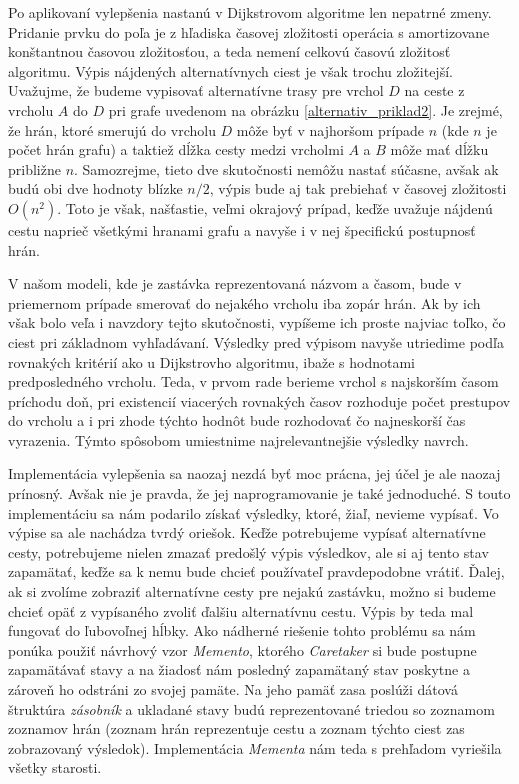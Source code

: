 Po aplikovaní vylepšenia nastanú v Dijkstrovom algoritme len nepatrné zmeny. Pridanie prvku do poľa je z hľadiska časovej zložitosti operácia s amortizovane konštantnou časovou zložitosťou, a teda nemení celkovú časovú zložitosť algoritmu. Výpis nájdených alternatívnych ciest je však trochu zložitejší. Uvažujme, že budeme vypisovať alternatívne trasy pre vrchol $D$ na ceste z vrcholu $A$ do $D$ pri grafe uvedenom na obrázku \ref{alternativ_priklad2}. Je zrejmé, že hrán, ktoré smerujú do vrcholu $D$ môže byť v najhoršom prípade $n$ (kde $n$ je počet hrán grafu) a taktiež dĺžka cesty medzi vrcholmi $A$ a $B$ môže mať dĺžku približne $n$. Samozrejme, tieto dve skutočnosti nemôžu nastať súčasne, avšak ak budú obi dve hodnoty blízke $n/2$, výpis bude aj tak prebiehať v časovej zložitosti $O(n^{2})$. Toto je však, našťastie, veľmi okrajový prípad, keďže uvažuje nájdenú cestu naprieč všetkými hranami grafu a navyše i v nej špecifickú postupnosť hrán.\newline

V našom modeli, kde je zastávka reprezentovaná názvom a časom, bude v priemernom prípade smerovať do nejakého vrcholu iba zopár hrán. Ak by ich však bolo veľa i navzdory tejto skutočnosti, vypíšeme ich proste najviac toľko, čo ciest pri základnom vyhľadávaní. Výsledky pred výpisom navyše utriedime podľa rovnakých kritérií ako u Dijkstrovho algoritmu, ibaže s hodnotami predposledného vrcholu. Teda, v prvom rade berieme vrchol s najskorším časom príchodu doň, pri existencií viacerých rovnakých časov rozhoduje počet prestupov do vrcholu a i pri zhode týchto hodnôt bude rozhodovať čo najneskorší čas vyrazenia. Týmto spôsobom umiestnime najrelevantnejšie výsledky navrch.\newline

Implementácia vylepšenia sa naozaj nezdá byť moc prácna, jej účel je ale naozaj prínosný. Avšak nie je pravda, že jej naprogramovanie je také jednoduché. S touto implementáciu sa nám podarilo získať výsledky, ktoré, žiaľ, nevieme vypísať. Vo výpise sa ale nachádza tvrdý oriešok. Keďže potrebujeme vypísať alternatívne cesty, potrebujeme nielen zmazať predošlý výpis výsledkov, ale si aj tento stav zapamätať, keďže sa k nemu bude chcieť používateľ pravdepodobne vrátiť. Ďalej, ak si zvolíme zobraziť alternatívne cesty pre nejakú zastávku, možno si budeme chcieť opäť z vypísaného zvoliť ďalšiu alternatívnu cestu. Výpis by teda mal fungovať do ľubovoľnej hĺbky. Ako nádherné riešenie tohto problému sa nám ponúka použiť návrhový vzor \textit{Memento}, ktorého \textit{Caretaker} si bude postupne zapamätávať stavy a na žiadosť nám posledný zapamätaný stav poskytne a zároveň ho odstráni zo svojej pamäte. Na jeho pamäť zasa poslúži dátová štruktúra \textit{zásobník} a ukladané stavy budú reprezentované triedou so zoznamom zoznamov hrán (zoznam hrán reprezentuje cestu a zoznam týchto ciest zas zobrazovaný výsledok). Implementácia \textit{Mementa} nám teda s prehľadom vyriešila všetky starosti.\newline

